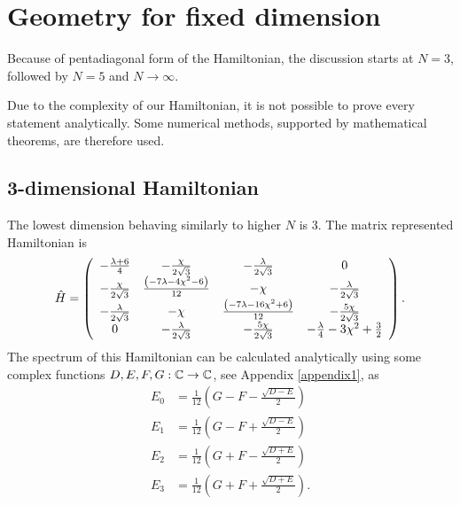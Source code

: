 \section{Geometry for fixed dimension}
Because of pentadiagonal form of the Hamiltonian, the discussion starts at $N=3$, followed by $N=5$ and $N\rightarrow\infty$.

Due to the complexity of our Hamiltonian, it is not possible to prove every statement analytically. Some numerical methods, supported by mathematical theorems, are therefore used.



\subsection{3-dimensional Hamiltonian}
The lowest dimension behaving similarly to higher $N$ is 3. The matrix represented Hamiltonian is
\begin{equation}
    \hat{H}=\left(
        \begin{array}{cccc}
         -\frac{ \lambda +6}{4} & -\frac{\chi }{2 \sqrt{3}} & -\frac{\lambda }{2 \sqrt{3}} & 0 \\
         -\frac{\chi }{2 \sqrt{3}} & \frac{ \left(-7 \lambda -4 \chi ^2-6\right)}{12} & -\chi  & -\frac{\lambda }{2 \sqrt{3}} \\
         -\frac{\lambda }{2 \sqrt{3}} & -\chi  & \frac{ \left(-7 \lambda -16 \chi ^2+6\right)}{12} & -\frac{5 \chi }{2 \sqrt{3}} \\
         0 & -\frac{\lambda }{2 \sqrt{3}} & -\frac{5 \chi }{2 \sqrt{3}} & -\frac{\lambda }{4}-3 \chi ^2+\frac{3}{2} \\
        \end{array}
        \right).
\end{equation}
The spectrum of this Hamiltonian can be calculated analytically using some complex functions $D, E, F, G:\mathbb{C}\rightarrow \mathbb{C}$, see Appendix \ref{appendix1}, as
\begin{align}
        E_0 &= \frac{1}{12} \left(G-F-\frac{\sqrt{D-E}}{2}\right)
        \label{eq:N=3_en0}\\
        E_1 &= \frac{1}{12}  \left(G-F+\frac{\sqrt{D-E}}{2}\right)
        \label{eq:N=3_en1}\\
        E_2 &= \frac{1}{12} \left(G+F-\frac{\sqrt{D+E}}{2}\right)
        \label{eq:N=3_en2}\\
        E_3 &= \frac{1}{12}  \left(G+F+\frac{\sqrt{D+E}}{2}\right).
        \label{eq:N=3_en3}
\end{align}
